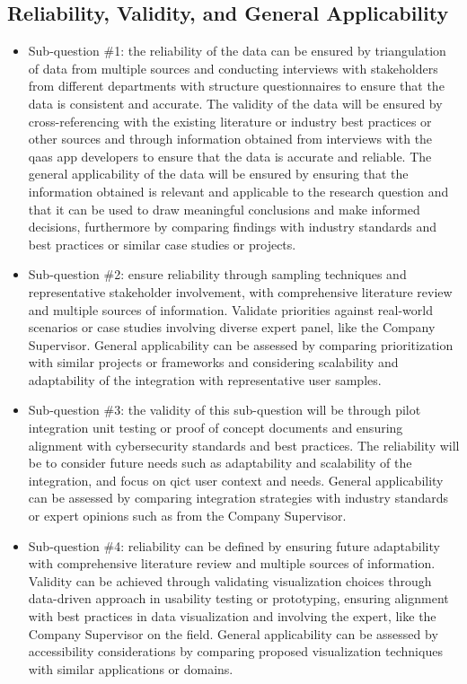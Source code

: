 \begin{multicols}{2}
  \subsection{Reliability, Validity, and General Applicability}
  \begin{itemize}[label=-]
    \item Sub-question \#1: the reliability of the data can be ensured by triangulation of data from
          multiple sources and conducting interviews with stakeholders from different departments with
          structure questionnaires to ensure that the data is consistent and accurate. The validity of
          the data will be ensured by  cross-referencing with the existing literature or industry best
          practices or other sources and  through information obtained from  interviews with the
          \acrshort{qaas} app developers to ensure  that the data is accurate and reliable. The general
          applicability of the data will be ensured by  ensuring that the information obtained is relevant
          and applicable to the research question and  that it can be used to draw meaningful conclusions
          and make informed decisions, furthermore by comparing findings with industry standards and best
          practices or similar case studies or projects.
    \item Sub-question \#2: ensure reliability through sampling techniques and representative stakeholder
          involvement, with comprehensive literature review and multiple sources of information. Validate
          priorities against real-world scenarios or case studies involving diverse expert panel, like
          the Company Supervisor. General applicability can be assessed by comparing prioritization with
          similar projects or frameworks and considering scalability and adaptability of the integration
          with representative user samples.
    \item Sub-question \#3: the validity of this sub-question will be through pilot integration unit testing
          or proof of concept documents and ensuring alignment with cybersecurity standards and best
          practices. The reliability will be to consider future needs such as adaptability and scalability of
          the integration, and focus on \acrshort{qict} user context and needs. General applicability can be
          assessed by comparing integration strategies with industry standards or expert opinions such as from
          the Company Supervisor.
    \item Sub-question \#4: reliability can be defined by ensuring future adaptability with comprehensive
          literature review and multiple sources of information. Validity can be achieved through validating
          visualization choices through data-driven approach in usability testing or  prototyping, ensuring
          alignment with best practices in data visualization and involving the expert, like the Company
          Supervisor on the field. General applicability can be assessed by accessibility considerations by
          comparing proposed visualization techniques with similar applications or domains.
  \end{itemize}

\end{multicols}
